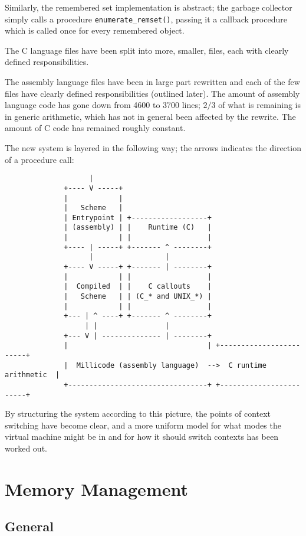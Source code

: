 Similarly, the remembered set implementation is abstract; the garbage
collector simply calls a procedure \verb+enumerate_remset()+, passing it a
callback procedure which is called once for every remembered object.

The C language files have been split into more, smaller, files, each with
clearly defined responsibilities.

The assembly language files have been in large part rewritten and each
of the few files have clearly defined responsibilities (outlined later).
The amount of assembly language code has gone down from 4600 to 3700 lines;
$2/3$ of what is remaining is in generic arithmetic, which has not in general
been affected by the rewrite. The amount of C code has remained roughly
constant.

The new system is layered in the following way; the arrows indicates the
direction of a procedure call:

\begin{verbatim}
                    |
              +---- V -----+
              |            |
              |   Scheme   |
              | Entrypoint | +------------------+
              | (assembly) | |    Runtime (C)   |
              |            | |                  |
              +---- | -----+ +------- ^ --------+
                    |                 |
              +---- V -----+ +------- | --------+
              |            | |                  |
              |  Compiled  | |    C callouts    |
              |   Scheme   | | (C_* and UNIX_*) |
              |            | |                  |
              +--- | ^ ----+ +------- ^ --------+
                   | |                |
              +--- V | -------------- | --------+
              |                                 | +------------------------+
              |  Millicode (assembly language)  -->  C runtime arithmetic  |
              +---------------------------------+ +------------------------+
\end{verbatim}

By structuring the system according to this picture, the points of context
switching have become clear, and a more uniform model for what modes the
virtual machine might be in and for how it should switch contexts has been
worked out.

\section{Memory Management}

\subsection{General}

